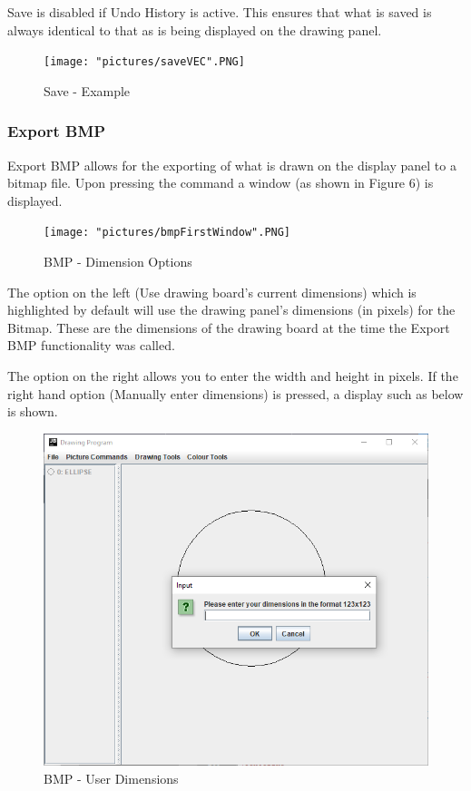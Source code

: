 \documentclass[12pt]{article} %
\begin{document}
Save is disabled if Undo History is active. This ensures that what is saved is always identical to that as is being displayed on the drawing panel.

\begin{figure}[hbtp]
\caption{Save - Example}
\centering
\texttt{[image: "pictures/saveVEC".PNG]}
\end{figure}

\subsubsection{Export BMP}
Export BMP allows for the exporting of what is drawn on the display panel to a bitmap file. Upon pressing the command a window (as shown in Figure 6) is displayed.

\begin{figure}[hbtp]
\caption{BMP - Dimension Options}
\centering
\texttt{[image: "pictures/bmpFirstWindow".PNG]}
\end{figure}

The option on the left (Use drawing board's current dimensions) which is highlighted by default will use the drawing panel's dimensions (in pixels) for the Bitmap. These are the dimensions of the drawing board at the time the Export BMP functionality was called.

The option on the right allows you to enter the width and height in pixels. If the right hand option (Manually enter dimensions) is pressed, a display such as below is shown.


\begin{figure}[H]
\caption{BMP - User Dimensions}
\centering
\includegraphics[scale=0.75]{pictures/bmpSecondWindow.PNG}
\end{figure}
\end{document}
